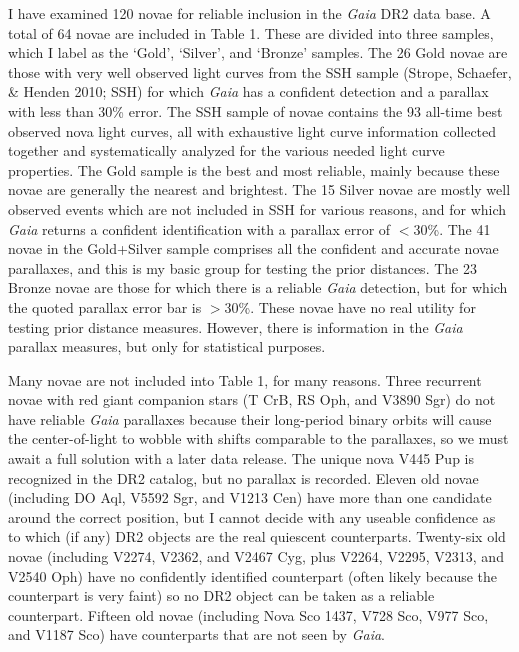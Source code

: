 \documentclass[a4paper,fleqn,usenatbib]{mnras}
\begin{document}
I have examined 120 novae for reliable inclusion in the {\it Gaia} DR2 data base.  A total of 64 novae are included in Table 1.  These are divided into three samples, which I label as the `Gold', `Silver', and `Bronze' samples.  The 26 Gold novae are those with very well observed light curves from the SSH sample (Strope, Schaefer, \& Henden 2010; SSH) for which {\it Gaia} has a confident detection and a parallax with less than 30\% error.  The SSH sample of novae contains the 93 all-time best observed nova light curves, all with exhaustive light curve information collected together and systematically analyzed for the various needed light curve properties.  The Gold sample is the best and most reliable, mainly because these novae are generally the nearest and brightest.  The 15 Silver novae are mostly well observed events which are not included in SSH for various reasons, and for which {\it Gaia} returns a confident identification with a parallax error of $<$30\%.  The 41 novae in the Gold+Silver sample comprises all the confident and accurate novae parallaxes, and this is my basic group for testing the prior distances.   The 23 Bronze novae are those for which there is a reliable {\it Gaia} detection, but for which the quoted parallax error bar is $>$30\%.  These novae have no real utility for testing prior distance measures.  However, there is information in the {\it Gaia} parallax measures, but only for statistical purposes.

Many novae are not included into Table 1, for many reasons.  Three recurrent novae with red giant companion stars (T CrB, RS Oph, and V3890 Sgr) do not have reliable {\it Gaia} parallaxes because their long-period binary orbits will cause the center-of-light to wobble with shifts comparable to the parallaxes, so we must await a full solution with a later data release.  The unique nova V445 Pup is recognized in the DR2 catalog, but no parallax is recorded.  Eleven old novae (including DO Aql, V5592 Sgr, and V1213 Cen) have more than one candidate around the correct position, but I cannot decide with any useable confidence as to which (if any) DR2 objects are the real quiescent counterparts.  Twenty-six old novae (including V2274, V2362, and V2467 Cyg, plus V2264, V2295, V2313, and V2540 Oph) have no confidently identified counterpart (often likely because the counterpart is very faint) so no DR2 object can be taken as a reliable counterpart.  Fifteen old novae (including Nova Sco 1437, V728 Sco, V977 Sco, and V1187 Sco) have counterparts that are not seen by {\it Gaia}.
\end{document}
